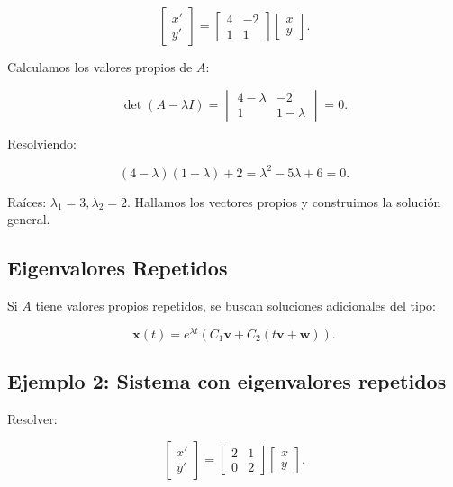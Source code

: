 \begin{equation}
\begin{bmatrix} x' \\ y' \end{bmatrix} =
\begin{bmatrix} 4 & -2 \\ 1 & 1 \end{bmatrix}
\begin{bmatrix} x \\ y \end{bmatrix}.
\end{equation}

Calculamos los valores propios de \( A \):

\begin{equation}
\det(A - \lambda I) = 
\begin{vmatrix} 4 - \lambda & -2 \\ 1 & 1 - \lambda \end{vmatrix} = 0.
\end{equation}

Resolviendo:

\begin{equation}
(4 - \lambda)(1 - \lambda) + 2 = \lambda^2 - 5\lambda + 6 = 0.
\end{equation}

Raíces: \( \lambda_1 = 3, \lambda_2 = 2 \). Hallamos los vectores propios y construimos la solución general.

\subsection{Eigenvalores Repetidos}
Si \( A \) tiene valores propios repetidos, se buscan soluciones adicionales del tipo:

\begin{equation}
\mathbf{x}(t) = e^{\lambda t} (C_1 \mathbf{v} + C_2 (t \mathbf{v} + \mathbf{w})).
\end{equation}

\subsection*{Ejemplo 2: Sistema con eigenvalores repetidos}
Resolver:

\begin{equation}
\begin{bmatrix} x' \\ y' \end{bmatrix} =
\begin{bmatrix} 2 & 1 \\ 0 & 2 \end{bmatrix}
\begin{bmatrix} x \\ y \end{bmatrix}.
\end{equation}

